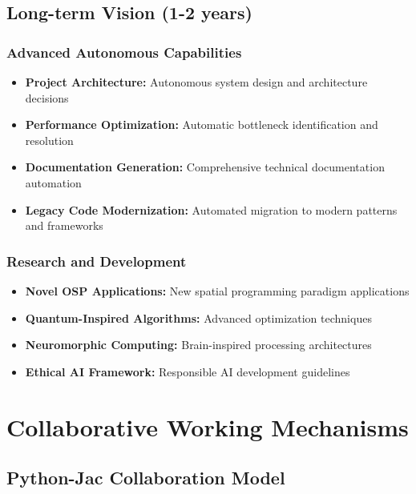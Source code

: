 \documentclass[12pt,a4paper]{article}
\begin{document}
\subsection{Long-term Vision (1-2 years)}

\subsubsection{Advanced Autonomous Capabilities}
\begin{itemize}
    \item \textbf{Project Architecture:} Autonomous system design and architecture decisions
    \item \textbf{Performance Optimization:} Automatic bottleneck identification and resolution
    \item \textbf{Documentation Generation:} Comprehensive technical documentation automation
    \item \textbf{Legacy Code Modernization:} Automated migration to modern patterns and frameworks
\end{itemize}

\subsubsection{Research and Development}
\begin{itemize}
    \item \textbf{Novel OSP Applications:} New spatial programming paradigm applications
    \item \textbf{Quantum-Inspired Algorithms:} Advanced optimization techniques
    \item \textbf{Neuromorphic Computing:} Brain-inspired processing architectures
    \item \textbf{Ethical AI Framework:} Responsible AI development guidelines
\end{itemize}

\section{Collaborative Working Mechanisms}

\subsection{Python-Jac Collaboration Model}
\end{document}
